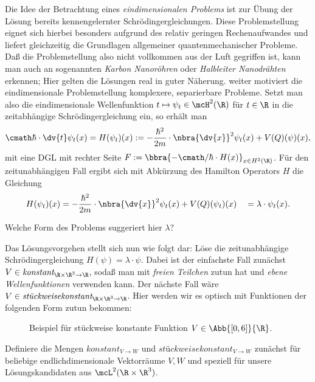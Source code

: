 \documentclass{subfiles}
\begin{document}

    Die Idee der Betrachtung eines \emph{eindimensionalen Problems} ist zur Übung der Lösung bereits kennengelernter Schrödingergleichungen. Diese Problemstellung eignet sich hierbei besonders aufgrund des relativ geringen Rechenaufwandes und liefert gleichzeitig die Grundlagen allgemeiner quantenmechanischer Probleme. Daß die Problemstellung also nicht vollkommen aus der Luft gegriffen ist, kann man auch an sogenannten \emph{Karbon Nanoröhren} oder \emph{Halbleiter Nanodrähten} erkennen; Hier gelten die Lösungen real in guter Näherung. weiter motiviert die eindimensionale Problemstellung komplexere, separierbare Probleme. Setzt man also die eindimensionale Wellenfunktion $t\mapsto\psi_t\in\mcH^2(\R)$ für $t\in\R$ in die zeitabhängige Schrödingergleichung ein, so erhält man
    \[\cmath\hbar\cdot \dv{t}\psi_t(x) = H(\psi_t)(x) := -\frac{\hbar^2}{2m}\cdot\nbra{\dv{x}}^2\psi_t(x) + V(Q)(\psi)(x),\]
    mit eine DGL mit rechter Seite $F:=\bbra{-\cmath/\hbar\cdot H(x)}_{x\in H^2(\R)}$. Für den zeitunabhängigen Fall ergibt sich mit Abkürzung des Hamilton Operators $H$ die Gleichung
    \[
        H(\psi_t)(x) = -\frac{\hbar^2}{2m}\cdot\nbra{\dv{x}}^2\psi_t(x) + V(Q)(\psi_t)(x) \quad = \lambda\cdot\psi_t(x).
    \]

    \begin{Aufgabe}
        \nr{} Welche Form des Problems suggeriert hier $\lambda$?  
    \end{Aufgabe}
    Das Lösungsvorgehen stellt sich nun wie folgt dar: Löse die zeitunabhängige Schrödingergleichung $H(\psi) = \lambda\cdot\psi$. Dabei ist der einfachste Fall zunächst $V\in\textit{konstant}_{\R\times\R^3\to\R}$, sodaß man mit \emph{freien Teilchen} zutun hat und \emph{ebene Wellenfunktionen} verwenden kann. Der nächste Fall wäre $V\in\textit{stückweisekonstant}_{\R\times\R^3\to\R}$. Hier werden wir es optisch mit Funktionen der folgenden Form zutun bekommen:
    \begin{figure}[H]
        \centering
        \caption{Beispiel für stückweise konstante Funktion $V\in\Abb{[0,6]}{\R}$.}
    \end{figure}
    \begin{Aufgabe}
        \nr{} Definiere die Mengen $\textit{konstant}_{V\to W}$ und $\textit{stückweisekonstant}_{V\to W}$ zunächst für beliebige endlichdimensionale Vektorräume $V,W$ und speziell für unsere Lösungskandidaten aus $\mcL^2(\R\times\R^3)$. 
    \end{Aufgabe}
\end{document}
